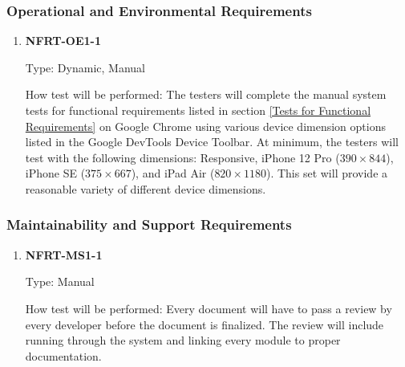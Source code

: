 \documentclass[12pt, titlepage]{article}
\begin{document}
\subsubsection{Operational and Environmental Requirements}
\begin{enumerate}

	\item \textbf{NFRT-OE1-1} %

	      Type: Dynamic, Manual

	      How test will be performed: The testers will complete the manual system tests for functional
	      requirements listed in section \ref{Tests for Functional Requirements} on Google Chrome using
	      various device dimension options listed in the Google DevTools Device Toolbar. At minimum, the
	      testers will test with the following dimensions: Responsive, iPhone 12 Pro ($390 \times 844$),
	      iPhone SE ($375 \times 667$), and iPad Air ($820 \times 1180$). This set will provide a reasonable
	      variety of different device dimensions.

\end{enumerate}

\subsubsection{Maintainability and Support Requirements}
\begin{enumerate}
	\item \textbf{NFRT-MS1-1} %

	      Type: Manual

	      How test will be performed: Every document will have to pass a review by every developer before the
	      document is finalized. The review will include running through the system and linking every module
	      to proper documentation.

\end{enumerate}
\end{document}
